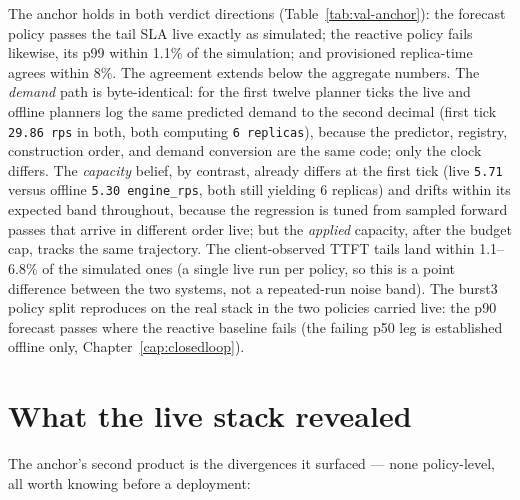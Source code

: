 The anchor holds in both verdict directions
(Table~\ref{tab:val-anchor}): the forecast policy passes the tail SLA
live exactly as simulated; the reactive policy fails likewise, its
p99 within 1.1\% of the simulation; and provisioned
replica-time agrees within 8\%. The agreement extends below the
aggregate numbers. The \emph{demand} path is byte-identical: for the
first twelve planner ticks the live and offline planners log the same
predicted demand to the second decimal (first tick \texttt{29.86 rps} in
both, both computing \texttt{6 replicas}), because the predictor,
registry, construction order, and demand conversion are the same code;
only the clock differs. The \emph{capacity} belief, by contrast, already
differs at the first tick (live \texttt{5.71} versus offline
\texttt{5.30 engine\_rps}, both still yielding 6 replicas) and drifts
within its expected band throughout, because the regression is tuned
from sampled forward passes that arrive in different order live; but the
\emph{applied} capacity,
after the budget cap, tracks the same trajectory. The
client-observed TTFT tails land within 1.1--6.8\% of the simulated ones
(a single live run per policy, so this is a point difference between the
two systems, not a repeated-run noise band). The burst3 policy split
reproduces on the real stack in the two policies carried live: the p90
forecast passes where the reactive baseline fails (the failing p50 leg
is established offline only, Chapter~\ref{cap:closedloop}).

\section{What the live stack revealed}
\label{sec:val-findings}

The anchor's second product is the divergences it surfaced --- none
policy-level, all worth knowing before a deployment:

